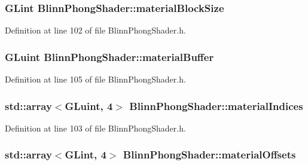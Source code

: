 \subsubsection[{material\+Block\+Size}]{\setlength{\rightskip}{0pt plus 5cm}G\+Lint Blinn\+Phong\+Shader\+::material\+Block\+Size\hspace{0.3cm}{\ttfamily [protected]}}\label{class_blinn_phong_shader_af38b3d042773f6568f0f6c227de85990}


Definition at line 102 of file Blinn\+Phong\+Shader.\+h.

\hypertarget{class_blinn_phong_shader_a85dbf4a8376a98570a06d9df17938cf4}{}
\subsubsection[{material\+Buffer}]{\setlength{\rightskip}{0pt plus 5cm}G\+Luint Blinn\+Phong\+Shader\+::material\+Buffer\hspace{0.3cm}{\ttfamily [protected]}}\label{class_blinn_phong_shader_a85dbf4a8376a98570a06d9df17938cf4}


Definition at line 105 of file Blinn\+Phong\+Shader.\+h.

\hypertarget{class_blinn_phong_shader_a2b14622a5d0f8ca32c05cc387700692a}{}
\subsubsection[{material\+Indices}]{\setlength{\rightskip}{0pt plus 5cm}std\+::array$<$G\+Luint, 4$>$ Blinn\+Phong\+Shader\+::material\+Indices\hspace{0.3cm}{\ttfamily [protected]}}\label{class_blinn_phong_shader_a2b14622a5d0f8ca32c05cc387700692a}


Definition at line 103 of file Blinn\+Phong\+Shader.\+h.

\hypertarget{class_blinn_phong_shader_a145f22608d6e32a4ec5df39388ad0530}{}
\subsubsection[{material\+Offsets}]{\setlength{\rightskip}{0pt plus 5cm}std\+::array$<$G\+Lint, 4$>$ Blinn\+Phong\+Shader\+::material\+Offsets\hspace{0.3cm}{\ttfamily [protected]}}\label{class_blinn_phong_shader_a145f22608d6e32a4ec5df39388ad0530}



